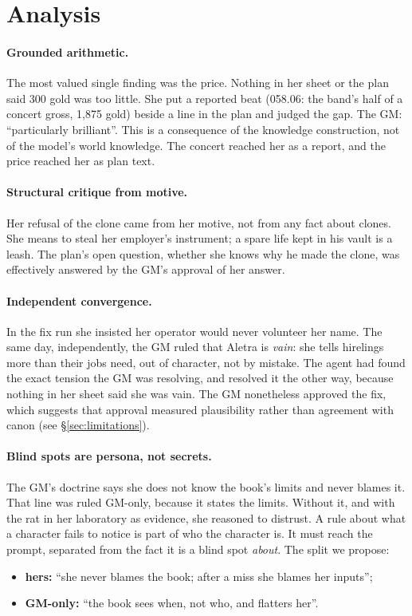 \documentclass[11pt]{article}
\begin{document}
\section{Analysis}
\label{sec:analysis}

\paragraph{Grounded arithmetic.} The most valued single finding was the price. Nothing in
her sheet or the plan said 300 gold was too little. She put a reported beat (058.06: the
band's half of a concert gross, 1{,}875 gold) beside a line in the plan and judged the gap.
The GM: ``particularly brilliant''. This is a consequence of the knowledge construction,
not of the model's world knowledge. The concert reached her as a report, and the price
reached her as plan text.

\paragraph{Structural critique from motive.} Her refusal of the clone came from her
motive, not from any fact about clones. She means to steal her employer's instrument; a
spare life kept in his vault is a leash. The plan's open question, whether she knows why
he made the clone, was effectively answered by the GM's approval of her answer.

\paragraph{Independent convergence.} In the fix run she insisted her operator would never
volunteer her name. The same day, independently, the GM ruled that Aletra is \emph{vain}:
she tells hirelings more than their jobs need, out of character, not by mistake. The
agent had found the exact tension the GM was resolving, and resolved it the other way,
because nothing in her sheet said she was vain. The GM nonetheless approved the fix, which
suggests that approval measured plausibility rather than agreement with canon (see
\S\ref{sec:limitations}).

\paragraph{Blind spots are persona, not secrets.} The GM's doctrine says she does not know
the book's limits and never blames it. That line was ruled GM-only, because it states the
limits. Without it, and with the rat in her laboratory as evidence, she reasoned to
distrust. A rule about what a character fails to notice is part of who the character is.
It must reach the prompt, separated from the fact it is a blind spot \emph{about}. The
split we propose:
\begin{itemize}[nosep]
\item \textbf{hers:} ``she never blames the book; after a miss she blames her inputs'';
\item \textbf{GM-only:} ``the book sees when, not who, and flatters her''.
\end{itemize}
\end{document}
